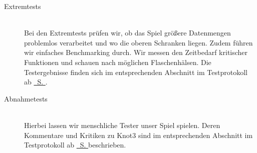 \begin{description}
	
	\item[Extremtests] \hfill
	\\
	
	Bei den Extremtests prüfen wir, ob das Spiel  größere Datenmengen problemlos verarbeitet und wo die oberen Schranken liegen. Zudem führen wir einfaches Benchmarking durch. Wir messen den Zeitbedarf kritischer Funktionen und schauen nach möglichen Flaschenhälsen. Die Testergebnisse finden sich im entsprechenden Abschnitt im Testprotokoll ab \hyperref[Abschnitt:Tests:Protokoll:Extrem]{\mousecursor~S. \pageref{Abschnitt:Tests:Protokoll:Extrem}}.\\



	\item[Abnahmetests] \hfill
	\\
	
	Hierbei lassen wir menschliche Tester unser Spiel spielen. Deren Kommentare und Kritiken zu Knot3 sind im entsprechenden Abschnitt im Testprotokoll ab \hyperref[Abschnitt:Tests:Protokoll:Abnahme]{\mousecursor~S. \pageref{Abschnitt:Tests:Protokoll:Abnahme}} beschrieben.\\
		
\end{description}







